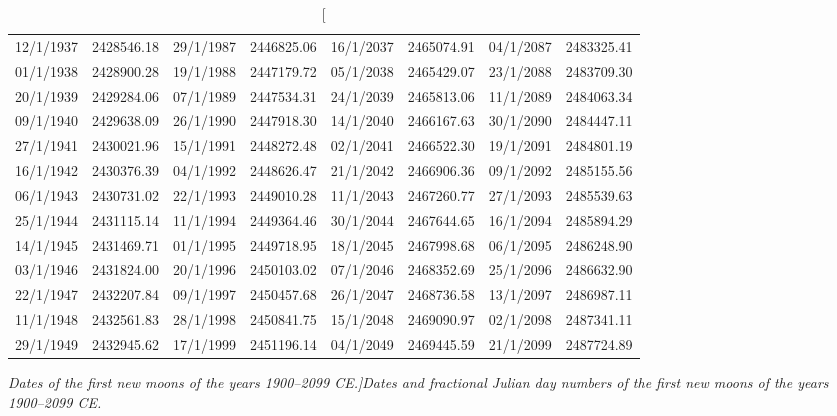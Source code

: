 \begin{table}
{\begin{tabular}{cc|cc|cc|cc}
12/1/1937 & 2428546.18 & 29/1/1987 & 2446825.06 & 16/1/2037 & 2465074.91 & 04/1/2087 & 2483325.41\\
01/1/1938 & 2428900.28 & 19/1/1988 & 2447179.72 & 05/1/2038 & 2465429.07 & 23/1/2088 & 2483709.30\\
20/1/1939 & 2429284.06 & 07/1/1989 & 2447534.31 & 24/1/2039 & 2465813.06 & 11/1/2089 & 2484063.34\\
09/1/1940 & 2429638.09 & 26/1/1990 & 2447918.30 & 14/1/2040 & 2466167.63 & 30/1/2090 & 2484447.11\\
27/1/1941 & 2430021.96 & 15/1/1991 & 2448272.48 & 02/1/2041 & 2466522.30 & 19/1/2091 & 2484801.19\\
16/1/1942 & 2430376.39 & 04/1/1992 & 2448626.47 & 21/1/2042 & 2466906.36 & 09/1/2092 & 2485155.56\\
06/1/1943 & 2430731.02 & 22/1/1993 & 2449010.28 & 11/1/2043 & 2467260.77 & 27/1/2093 & 2485539.63\\
25/1/1944 & 2431115.14 & 11/1/1994 & 2449364.46 & 30/1/2044 & 2467644.65 & 16/1/2094 & 2485894.29\\
14/1/1945 & 2431469.71 & 01/1/1995 & 2449718.95 & 18/1/2045 & 2467998.68 & 06/1/2095 & 2486248.90\\
03/1/1946 & 2431824.00 & 20/1/1996 & 2450103.02 & 07/1/2046 & 2468352.69 & 25/1/2096 & 2486632.90\\
22/1/1947 & 2432207.84 & 09/1/1997 & 2450457.68 & 26/1/2047 & 2468736.58 & 13/1/2097 & 2486987.11\\
11/1/1948 & 2432561.83 & 28/1/1998 & 2450841.75 & 15/1/2048 & 2469090.97 & 02/1/2098 & 2487341.11\\
29/1/1949 & 2432945.62 & 17/1/1999 & 2451196.14 & 04/1/2049 & 2469445.59 & 21/1/2099 & 2487724.89\\
\end{tabular}}
\caption[\em  Dates of the first new moons of the years 1900--2099 CE.]{\em Dates and fractional Julian day numbers of the first new moons of the years 1900--2099 CE.}\label{tnewmoon}
\end{table}

